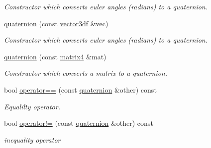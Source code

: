 \begin{DoxyCompactItemize}
\begin{DoxyCompactList}\small\item\em Constructor which converts euler angles (radians) to a quaternion. \end{DoxyCompactList}\item 
\mbox{\label{classirr_1_1core_1_1quaternion_af8d613780a8d0e3f2775f6f9086db3b0}} 
\hyperlink{classirr_1_1core_1_1quaternion_af8d613780a8d0e3f2775f6f9086db3b0}{quaternion} (const \hyperlink{namespaceirr_1_1core_a06f169d08b5c429f5575acb7edbad811}{vector3df} \&vec)
\begin{DoxyCompactList}\small\item\em Constructor which converts euler angles (radians) to a quaternion. \end{DoxyCompactList}\item 
\mbox{\label{classirr_1_1core_1_1quaternion_a60b4e1a97224c18da64e49861b8d0107}} 
\hyperlink{classirr_1_1core_1_1quaternion_a60b4e1a97224c18da64e49861b8d0107}{quaternion} (const \hyperlink{namespaceirr_1_1core_a73fa92e638c5ca97efd72da307cc9b65}{matrix4} \&mat)
\begin{DoxyCompactList}\small\item\em Constructor which converts a matrix to a quaternion. \end{DoxyCompactList}\item 
\mbox{\label{classirr_1_1core_1_1quaternion_a73a513d1c05be8c3007bf7f615b92dd4}} 
bool \hyperlink{classirr_1_1core_1_1quaternion_a73a513d1c05be8c3007bf7f615b92dd4}{operator==} (const \hyperlink{classirr_1_1core_1_1quaternion}{quaternion} \&other) const
\begin{DoxyCompactList}\small\item\em Equalilty operator. \end{DoxyCompactList}\item 
\mbox{\label{classirr_1_1core_1_1quaternion_a5438edad0c932d06d6f23651903fed83}} 
bool \hyperlink{classirr_1_1core_1_1quaternion_a5438edad0c932d06d6f23651903fed83}{operator!=} (const \hyperlink{classirr_1_1core_1_1quaternion}{quaternion} \&other) const
\begin{DoxyCompactList}\small\item\em inequality operator \end{DoxyCompactList}\item 

\end{DoxyCompactItemize}
